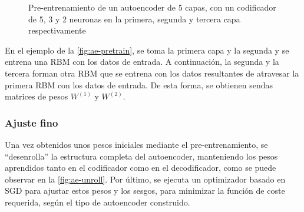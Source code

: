 \begin{figure}[hbtp]
  \caption[Pre-entrenamiento de un autoencoder]{Pre-entrenamiento de un autoencoder de 5 capas, con un codificador de 5, 3 y 2 neuronas en la primera, segunda y tercera capa respectivamente}
  \label{fig:ae-pretrain}
\end{figure}

En el ejemplo de la \autoref{fig:ae-pretrain}, se toma la primera capa y la segunda y se entrena una RBM con los datos de entrada. A continuación, la segunda y la tercera forman otra RBM que se entrena con los datos resultantes de atravesar la primera RBM con los datos de entrada. De esta forma, se obtienen sendas matrices de pesos $W^{(1)}$ y $W^{(2)}$.

\subsubsection{Ajuste fino}\label{ajuste-fino}

Una vez obtenidos unos pesos iniciales mediante el pre-entrenamiento, se ``desenrolla'' la estructura completa del autoencoder, manteniendo los pesos aprendidos tanto en el codificador como en el decodificador, como se puede observar en la \autoref{fig:ae-unroll}. Por último, se ejecuta un optimizador basado en SGD para ajustar estos pesos y los sesgos, para minimizar la función de coste requerida, según el tipo de autoencoder construido.

